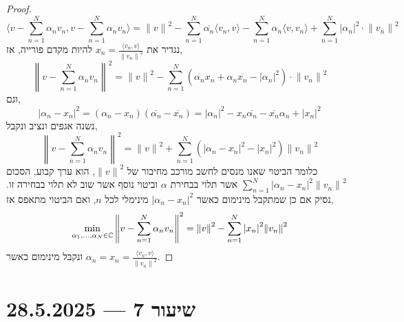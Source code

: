\begin{proof}
	\[
		\langle v - \sum_{n = 1}^N \alpha_n v_n, v - \sum_{n = 1}^N \alpha_n v_n \rangle
		= {\lVert v \rVert}^2 - \sum_{n = 1}^N \overline{\alpha_n} \langle v_n, v \rangle - \sum_{n = 1}^N \alpha_n \langle v, v_n \rangle + \sum_{n = 1}^N {| \alpha_n |}^2 \cdot {\lVert v_n \rVert}^2
	\]
	נגדיר את $x_n = \frac{\langle v_n, v \rangle}{{\lVert v_n \rVert}^2}$ להיות מקדם פורייה, אז,
	\[
		{\left\lVert v - \sum_{n = 1}^N \alpha_n v_n \right\rVert}^2
		= {\lVert v \rVert}^2 - \sum_{n = 1}^N (\overline{\alpha_n} x_n + \alpha_n \overline{x_n} - {| \alpha_n |}^2) \cdot {\lVert v_n \rVert}^2
	\]
	וגם,
	\[
		{|\alpha_n - x_n|}^2
		= (\alpha_n - x_n)(\overline{\alpha_n} - \overline{x_n})
		= {|\alpha_n|}^2 - x_n \overline{\alpha_n} - \overline{x_n} \alpha_n  + {|x_n|}^2
	\]
	נשנה אגפים ונציב ונקבל,
	\[
		{\left\lVert v - \sum_{n = 1}^N \alpha_n v_n \right\rVert}^2
		= {\lVert v \rVert}^2 + \sum_{n = 1}^N \left( {|\alpha_n - x_n|}^2 - {|x_n|}^2 \right) {\lVert v_n \rVert}^2
	\]
	כלומר הביטוי שאנו מנסים לחשב מורכב מחיבור של ${\lVert v \rVert}^2$, הוא ערך קבוע, הסכום $\sum_{n = 1}^N {|\alpha_n - x_n|}^2 {\lVert v_n \rVert}^2$ אשר תלוי בבחירת $\alpha$ וביטוי נוסף אשר שוב לא תלוי בבחירה זו.
	נסיק אם כן שמתקבל מינימום כאשר ${| \alpha_n - x_n |}^2$ מינימלי לכל $n$, ואם הביטוי מתאפס אז,
	\[
		\min_{\alpha_1, \ldots, \alpha_N \in \mathbb{C}} {\left\lVert v - \sum_{n = 1}^N \alpha_n v_n \right\rVert}^2
		= {\lVert v \rVert}^2 - \sum_{n = 1}^N {|x_n|}^2 {\lVert v_n \rVert}^2
	\]
	ונקבל מינימום כאשר $\alpha_n = x_n = \frac{\langle v_n, v \rangle}{{\lVert v_n \rVert}^2}$.
\end{proof}

\section{שיעור 7 --- 28.5.2025}

